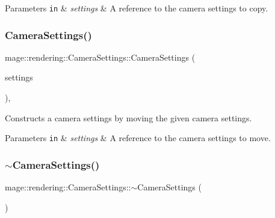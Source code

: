 \begin{DoxyParams}[1]{Parameters}
\mbox{\tt in}  & {\em settings} & A reference to the camera settings to copy. \\
\hline
\end{DoxyParams}
\hypertarget{classmage_1_1rendering_1_1_camera_settings_a08e6d9c319feb6af0c14f4d057220da8}{}\label{classmage_1_1rendering_1_1_camera_settings_a08e6d9c319feb6af0c14f4d057220da8} 
\subsubsection{\texorpdfstring{Camera\+Settings()}{CameraSettings()}\hspace{0.1cm}{\footnotesize\ttfamily [3/3]}}
{\footnotesize\ttfamily mage\+::rendering\+::\+Camera\+Settings\+::\+Camera\+Settings (\begin{DoxyParamCaption}\item[{\hyperlink{classmage_1_1rendering_1_1_camera_settings}{Camera\+Settings} \&\&}]{settings }\end{DoxyParamCaption})\hspace{0.3cm}{\ttfamily [default]}, {\ttfamily [noexcept]}}

Constructs a camera settings by moving the given camera settings.


\begin{DoxyParams}[1]{Parameters}
\mbox{\tt in}  & {\em settings} & A reference to the camera settings to move. \\
\hline
\end{DoxyParams}
\hypertarget{classmage_1_1rendering_1_1_camera_settings_a0e5badc4e959b8ddad0d7df2da4c934f}{}\label{classmage_1_1rendering_1_1_camera_settings_a0e5badc4e959b8ddad0d7df2da4c934f} 
\subsubsection{\texorpdfstring{$\sim$\+Camera\+Settings()}{~CameraSettings()}}
{\footnotesize\ttfamily mage\+::rendering\+::\+Camera\+Settings\+::$\sim$\+Camera\+Settings (\begin{DoxyParamCaption}{ }\end{DoxyParamCaption})\hspace{0.3cm}{\ttfamily [default]}}

